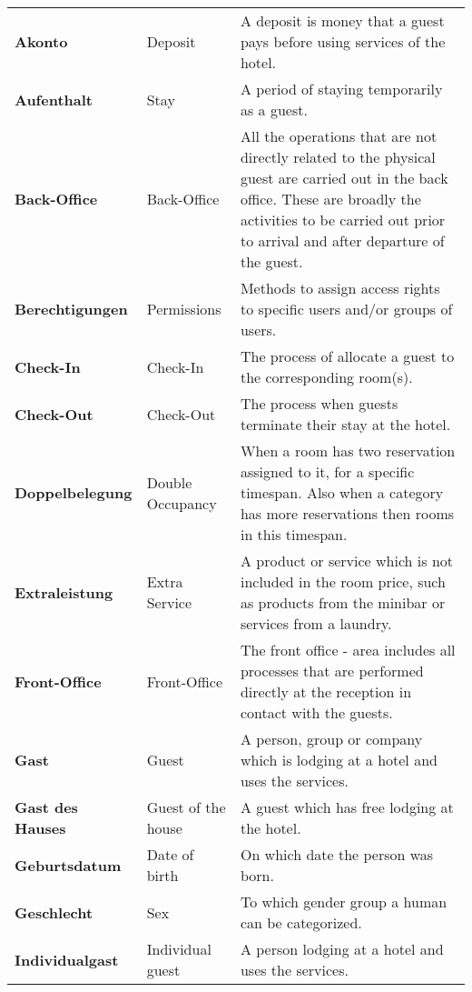 \documentclass[../Pflichtenheft.tex]{subfiles}
\begin{document}
    \begin{longtable}{p{4cm} p{4cm} p{6cm}}
        \textbf{Akonto} & {Deposit} & A deposit is money that a guest pays before using services of the hotel. \\[0.5cm]
        \textbf{Aufenthalt} & {Stay} & A period of staying temporarily as a guest. \\[0.5cm]
        \textbf{Back-Office} & {Back-Office} & All the operations that are not directly related to the physical guest are carried out in the back office. These are broadly the activities to be carried out prior to arrival and after departure of the guest. \\[0.5cm]
        \textbf{Berechtigungen} & {Permissions} & Methods to assign access rights to specific users and/or groups of users. \\[0.5cm]
        \textbf{Check-In} & {Check-In} & The process of allocate a guest to the corresponding room(s). \\[0.5cm]
        \textbf{Check-Out} & {Check-Out} & The process when guests terminate their stay at the hotel. \\[0.5cm]
        \textbf{Doppelbelegung} & {Double Occupancy} & When a room has two reservation assigned to it, for a specific timespan. Also when a category has more reservations then rooms in this timespan. \\[0.5cm]
        \textbf{Extraleistung} & {Extra Service} & A product or service which is not included in the room price, such as products from the minibar or services from a laundry. \\[0.5cm]
        \textbf{Front-Office} & {Front-Office} & The front office - area includes all processes that are performed directly at the reception in contact with the guests. \\[0.5cm]
        \textbf{Gast} & {Guest} & A person, group or company which is lodging at a hotel and uses the services. \\[0.5cm]
        \textbf{Gast des Hauses} & {Guest of the house} & A guest which has free lodging at the hotel. \\[0.5cm]
        \textbf{Geburtsdatum} & {Date of birth} & On which date the person was born. \\[0.5cm]
        \textbf{Geschlecht} & {Sex} & To which gender group a human can be categorized. \\[0.5cm]
        \textbf{Individualgast} & {Individual guest} & A person lodging at a hotel and uses the services. \\[0.5cm]

\end{longtable}
\end{document}
